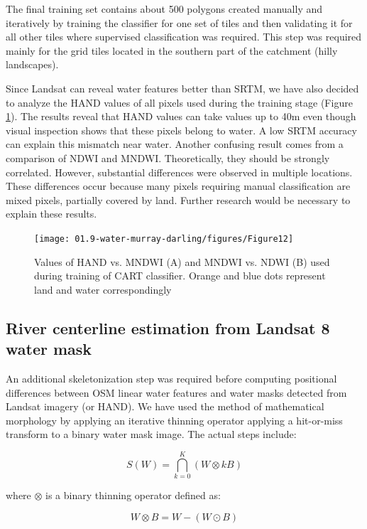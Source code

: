 The final training set contains about 500 polygons created manually and iteratively by training the classifier for one set of tiles and then validating it for all other tiles where supervised classification was required. This step was required mainly for the grid tiles located in the southern part of the catchment (hilly landscapes).

Since Landsat can reveal water features better than SRTM, we have also decided to analyze the HAND values of all pixels used during the training stage (Figure \ref{fig:au-hand-vs-mndwi}). The results reveal that HAND values can take values up to 40m even though visual inspection shows that these pixels belong to water. A low SRTM accuracy can explain this mismatch near water. Another confusing result comes from a comparison of NDWI and MNDWI. Theoretically, they should be strongly correlated. However, substantial differences were observed in multiple locations. These differences occur because many pixels requiring manual classification are mixed pixels, partially covered by land. Further research would be necessary to explain these results.

\begin{figure}[H]
	\centering
	\texttt{[image: 01.9-water-murray-darling/figures/Figure12]}
	\caption{Values of HAND vs. MNDWI (A) and MNDWI vs. NDWI (B) used during training of CART classifier. Orange and blue dots represent land and water correspondingly}
	\label{fig:au-hand-vs-mndwi}
\end{figure}

\subsection{River centerline estimation from Landsat 8 water mask}
An additional skeletonization step was required before computing positional differences between OSM linear water features and water masks detected from Landsat imagery (or HAND). We have used the method of mathematical morphology \citep{Serra1982} by applying an iterative thinning operator applying a hit-or-miss transform to a binary water mask image. The actual steps include:

\begin{equation}
S(W)=\bigcap_{k=0}^K \left(W \otimes kB \right)
\end{equation}

where $\otimes$ is a binary thinning operator defined as:

\begin{equation}
W \otimes B = W - \left( W \odot B \right)
\end{equation}

